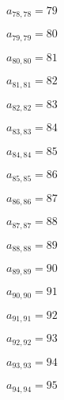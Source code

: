 \documentclass[a4paper,12pt]{article}
\begin{document}
$a _{ 78, 78 } = 79$

$a _{ 79, 79 } = 80$

$a _{ 80, 80 } = 81$

$a _{ 81, 81 } = 82$

$a _{ 82, 82 } = 83$

$a _{ 83, 83 } = 84$

$a _{ 84, 84 } = 85$

$a _{ 85, 85 } = 86$

$a _{ 86, 86 } = 87$

$a _{ 87, 87 } = 88$

$a _{ 88, 88 } = 89$

$a _{ 89, 89 } = 90$

$a _{ 90, 90 } = 91$

$a _{ 91, 91 } = 92$

$a _{ 92, 92 } = 93$

$a _{ 93, 93 } = 94$

$a _{ 94, 94 } = 95$
\end{document}
